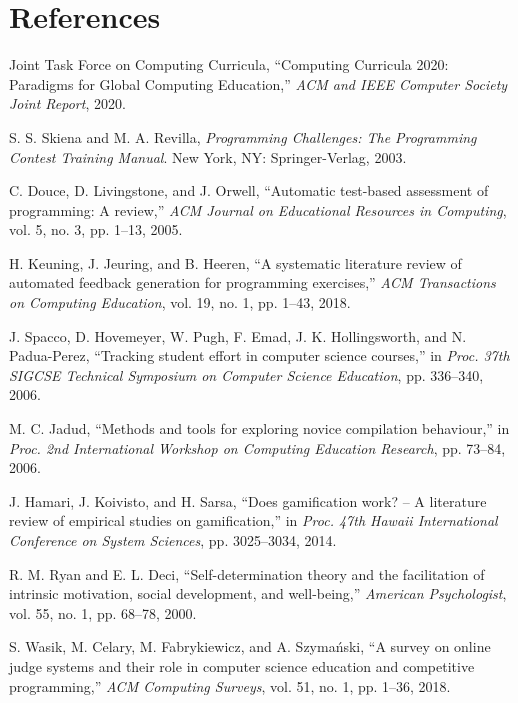 \documentclass[12pt,a4paper]{article}
\begin{document}
\section*{References}
\begin{enumerate}[label={[\arabic*]}, leftmargin=1.8em, itemsep=0pt, parsep=0pt]
    \item Joint Task Force on Computing Curricula, ``Computing Curricula 2020: Paradigms for Global Computing Education,'' \textit{ACM and IEEE Computer Society Joint Report}, 2020.
    \item S. S. Skiena and M. A. Revilla, \textit{Programming Challenges: The Programming Contest Training Manual}. New York, NY: Springer-Verlag, 2003.
    \item C. Douce, D. Livingstone, and J. Orwell, ``Automatic test-based assessment of programming: A review,'' \textit{ACM Journal on Educational Resources in Computing}, vol. 5, no. 3, pp. 1--13, 2005.
    \item H. Keuning, J. Jeuring, and B. Heeren, ``A systematic literature review of automated feedback generation for programming exercises,'' \textit{ACM Transactions on Computing Education}, vol. 19, no. 1, pp. 1--43, 2018.
    \item J. Spacco, D. Hovemeyer, W. Pugh, F. Emad, J. K. Hollingsworth, and N. Padua-Perez, ``Tracking student effort in computer science courses,'' in \textit{Proc. 37th SIGCSE Technical Symposium on Computer Science Education}, pp. 336--340, 2006.
    \item M. C. Jadud, ``Methods and tools for exploring novice compilation behaviour,'' in \textit{Proc. 2nd International Workshop on Computing Education Research}, pp. 73--84, 2006.
    \item J. Hamari, J. Koivisto, and H. Sarsa, ``Does gamification work? -- A literature review of empirical studies on gamification,'' in \textit{Proc. 47th Hawaii International Conference on System Sciences}, pp. 3025--3034, 2014.
    \item R. M. Ryan and E. L. Deci, ``Self-determination theory and the facilitation of intrinsic motivation, social development, and well-being,'' \textit{American Psychologist}, vol. 55, no. 1, pp. 68--78, 2000.
    \item S. Wasik, M. Celary, M. Fabrykiewicz, and A. Szymański, ``A survey on online judge systems and their role in computer science education and competitive programming,'' \textit{ACM Computing Surveys}, vol. 51, no. 1, pp. 1--36, 2018.

\end{enumerate}
\end{document}
